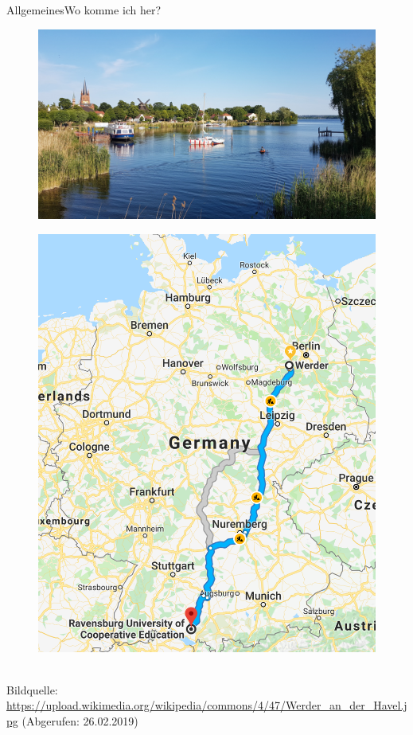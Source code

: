 	\begin{frame}{Allgemeines}{Wo komme ich her?}
		\begin{minipage}{0.7\textwidth}
		\centering
			\begin{figure}
			\centering
			\includegraphics[width=.95\linewidth]{graph/werder.jpg}
		\end{figure}
		\end{minipage}%
		\begin{minipage}{0.3\textwidth}
		\centering
			\begin{figure}
			\centering
			\includegraphics[width=.95\linewidth]{graph/route2werder.png}
			\end{figure}
		\end{minipage}
		\\
		\tiny{Bildquelle: \url{https://upload.wikimedia.org/wikipedia/commons/4/47/Werder_an_der_Havel.jpg} (Abgerufen: 26.02.2019)}
	\end{frame}

